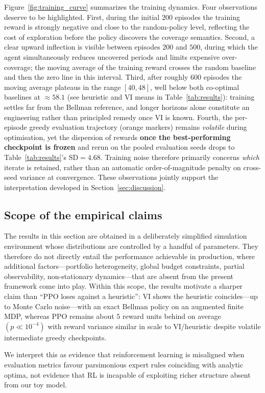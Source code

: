 Figure~\ref{fig:training_curve} summarizes the training dynamics. Four
observations deserve to be highlighted. First, during the initial
$200$ episodes the training reward is strongly negative and close to
the random-policy level, reflecting the cost of exploration before the
policy discovers the coverage semantics. Second, a clear upward
inflection is visible between episodes $200$ and $500$, during which
the agent simultaneously reduces uncovered periods and limits
expensive over-coverage; the moving average of the training reward
crosses the random baseline and then the zero line in this interval.
Third, after roughly $600$ episodes the moving average plateaus in the
range $[40, 48]$, well below both co-optimal baselines at $\approx 58.1$
(see heuristic and VI means in Table~\ref{tab:results}): training settles
far from the Bellman reference, and longer horizons alone constitute an
engineering rather than principled remedy once VI is known. Fourth, the per-episode greedy evaluation trajectory (orange markers)
remains \emph{volatile} during optimisation, yet the dispersion of rewards
\textbf{once the best-performing checkpoint is frozen} and rerun on the pooled
evaluation seeds drops to Table~\ref{tab:results}'s $\text{SD} = 4.68$. Training
noise therefore primarily concerns \emph{which} iterate is retained, rather than an
automatic order-of-magnitude penalty on cross-seed variance at convergence.
These observations jointly support the interpretation developed in
Section~\ref{sec:discussion}.


\subsection{Scope of the empirical claims}
\label{subsec:scope}

The results in this section are obtained in a deliberately simplified
simulation environment whose distributions are controlled by a handful
of parameters. They therefore do not directly entail the performance
achievable in production, where additional factors---portfolio
heterogeneity, global budget constraints, partial observability,
non-stationary dynamics---that are absent from the present framework
come into play. Within this scope, the results motivate a sharper claim than ``PPO loses
against a heuristic'': VI shows the heuristic coincides---up to Monte Carlo
noise---with an exact Bellman policy on an augmented finite MDP, whereas PPO remains
about $5$ reward units behind on average $(p \ll 10^{-4})$ with reward variance
similar in scale to VI/heuristic despite volatile intermediate greedy checkpoints.

We interpret this as evidence that reinforcement learning is misaligned when
evaluation metrics favour parsimonious expert rules coinciding with analytic optima,
not evidence that RL is incapable of exploiting richer structure absent from our toy model.
